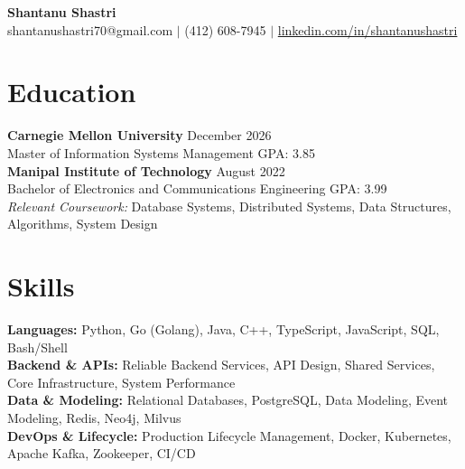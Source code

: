\documentclass[11pt,a4paper]{article}
\begin{document}
\begin{center}
    \Huge \textbf{Shantanu Shastri} \\
    \vspace{2pt}
    \small shantanushastri70@gmail.com $|$ (412) 608-7945 $|$ \href{https://linkedin.com/in/shantanushastri}{linkedin.com/in/shantanushastri}
\end{center}

\vspace{-5pt}
\section{Education}
\noindent
\textbf{Carnegie Mellon University} \hfill December 2026 \\
Master of Information Systems Management \hfill GPA: 3.85 \\
\textbf{Manipal Institute of Technology} \hfill August 2022 \\
Bachelor of Electronics and Communications Engineering \hfill GPA: 3.99 \\
\textit{Relevant Coursework:} Database Systems, Distributed Systems, Data Structures, Algorithms, System Design

\vspace{-5pt}
\section{Skills}
\noindent
\textbf{Languages:} Python, Go (Golang), Java, C++, TypeScript, JavaScript, SQL, Bash/Shell \\
\textbf{Backend \& APIs:} Reliable Backend Services, API Design, Shared Services, Core Infrastructure, System Performance \\
\textbf{Data \& Modeling:} Relational Databases, PostgreSQL, Data Modeling, Event Modeling, Redis, Neo4j, Milvus \\
\textbf{DevOps \& Lifecycle:} Production Lifecycle Management, Docker, Kubernetes, Apache Kafka, Zookeeper, CI/CD

\vspace{-5pt}
\end{document}
